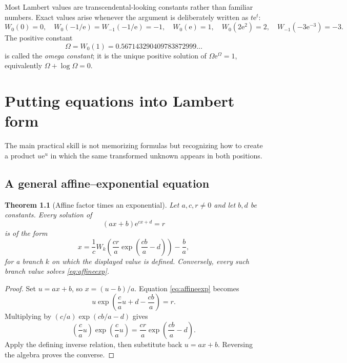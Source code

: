 \documentclass[11pt,oneside]{book}
\newtheorem{theorem}{Theorem}[chapter]
\theoremstyle{definition}
\theoremstyle{remark}
\newcommand{\ee}{\mathrm e}
\begin{document}
Most Lambert values are transcendental-looking constants rather than familiar
numbers.  Exact values arise whenever the argument is deliberately written as
$t\ee^t$:
\[
 W_0(0)=0,
 \quad W_0(-1/\ee)=W_{-1}(-1/\ee)=-1,
 \quad W_0(\ee)=1,
 \quad W_0(2\ee^2)=2,
 \quad W_{-1}(-3\ee^{-3})=-3.
\]
The positive constant
\begin{equation}\label{eq:omega}
  \Omega=W_0(1)=0.567143290409783872999\ldots
\end{equation}
is called the \emph{omega constant}; it is the unique positive solution of
$\Omega\ee^\Omega=1$, equivalently $\Omega+\log\Omega=0$.

\begin{center}

\end{center}

\chapter{Putting equations into Lambert form}\label{ch:equations}

The main practical skill is not memorizing formulas but recognizing how to
create a product $u\ee^u$ in which the same transformed unknown appears in
both positions.

\section{A general affine--exponential equation}

\begin{theorem}[Affine factor times an exponential]\label{thm:affineexp}
Let $a,c,r\ne0$ and let $b,d$ be constants.  Every solution of
\begin{equation}\label{eq:affineexp}
  (ax+b)\ee^{cx+d}=r
\end{equation}
is of the form
\begin{equation}\label{eq:affineexpsolution}
  x=\frac1c W_k\!\left(\frac{cr}{a}
       \exp\!\left(\frac{cb}{a}-d\right)\right)-\frac ba,
\end{equation}
for a branch $k$ on which the displayed value is defined.  Conversely, every
such branch value solves \eqref{eq:affineexp}.
\end{theorem}

\begin{proof}
Set $u=ax+b$, so $x=(u-b)/a$.  Equation \eqref{eq:affineexp} becomes
\[
 u\exp\!\left(\frac ca u+d-\frac{cb}{a}\right)=r.
\]
Multiplying by $(c/a)\exp(cb/a-d)$ gives
\[
 \left(\frac ca u\right)\exp\!\left(\frac ca u\right)
 =\frac{cr}{a}\exp\!\left(\frac{cb}{a}-d\right).
\]
Apply the defining inverse relation, then substitute back
$u=ax+b$.  Reversing the algebra proves the converse.
\end{proof}
\end{document}
